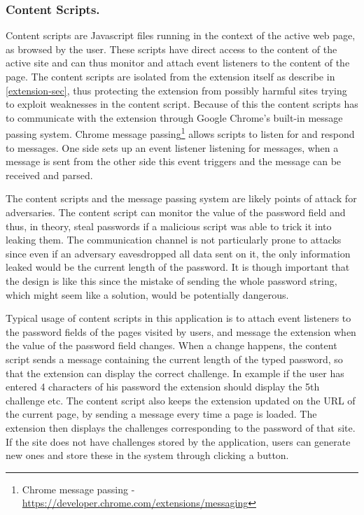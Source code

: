 \subsubsection{Content Scripts.}\label{cs}
Content scripts are Javascript files running in the context of the active web page, as browsed by the user. These scripts have direct access to the content of the active site and can thus monitor and attach event listeners to the content of the page. The content scripts are isolated from the extension itself as describe in \autoref{extension-sec}, thus protecting the extension from possibly harmful sites trying to exploit weaknesses in the content script. Because of this the content scripts has to communicate with the extension through Google Chrome's built-in message passing system. Chrome message passing\footnote{Chrome message passing - \url{https://developer.chrome.com/extensions/messaging}} allows scripts to listen for and respond to messages. One side sets up an event listener listening for messages, when a message is sent from the other side this event triggers and the message can be received and parsed. 
\par The content scripts and the message passing system are likely points of attack for adversaries. The content script can monitor the value of the password field and thus, in theory, steal passwords if a malicious script was able to trick it into leaking them. The communication channel is not particularly prone to attacks since even if an adversary eavesdropped all data sent on it, the only information leaked would be the current length of the password. It is though important that the design is like this since the mistake of sending the whole password string, which might seem like a solution, would be potentially dangerous. 
\par Typical usage of content scripts in this application is to attach event listeners to the password fields of the pages visited by users, and message the extension when the value of the password field changes. When a change happens, the content script sends a message containing the current length of the typed password, so that the extension can display the correct challenge. In example if the user has entered 4 characters of his password the extension should display the 5th challenge etc. The content script also keeps the extension updated on the URL of the current page, by sending a message every time a page is loaded. The extension then displays the challenges corresponding to the password of that site. If the site does not have challenges stored by the application, users can generate new ones and store these in the system through clicking a button.  

